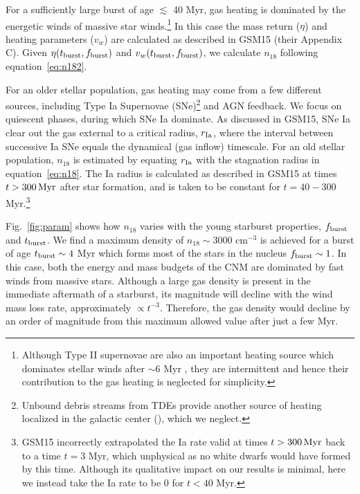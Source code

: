 \documentclass[usenatbib,fleqn]{mnras}
\newcommand{\Msun}{{\rm M_\odot}}
\begin{document}
For a sufficiently large burst of age $\lesssim$ 40 Myr, gas
heating is dominated by the energetic winds of massive star
winds.\footnote{Although Type II supernovae are also an important heating
  source which dominates stellar winds after $\sim$6 Myr
  \citep{Voss+2009}, they are intermittent and hence their
  contribution to the gas heating is neglected for simplicity.}  In
this case the mass return ($\eta$) and heating parameters ($v_w$) are
calculated as described in GSM15 (their Appendix C).  Given
$\eta(t_{\rm burst},f_{\rm burst})$ and $v_w(t_{\rm burst},f_{\rm
  burst})$, we calculate $n_{18}$ following equation~\eqref{eq:n182}.

For an older stellar population, gas heating may come from a few
different sources, including Type Ia Supernovae (SNe)\footnote{Unbound
  debris streams from TDEs provide another source of heating localized
  in the galactic center (\citealt{Guillochon+2015a}), which we
  neglect.} and AGN feedback.  We focus on
quiescent phases, during which SNe Ia dominate.  As discussed in
GSM15, SNe Ia clear out the gas external to a critical radius, $r_{\rm
  Ia}$, where the interval between successive Ia SNe equals the
dynamical (gas inflow) timescale.  For an old stellar population,
$n_{18}$ is estimated by equating $r_{\rm Ia}$ with the stagnation
radius in equation~\eqref{eq:n18}.  The Ia radius is calculated as
described in GSM15 at times $t>300 \,{\rm Myr}$ after star formation,
and is taken to be constant for $t = 40-300$ Myr.\footnote{GSM15
  incorrectly extrapolated the Ia rate valid at times $t>300 \,{\rm
    Myr}$ back to a time $t = 3$ Myr, which unphysical as no white
  dwarfs would have formed by this time.  Although its qualitative
  impact on our results is minimal, here we instead take the Ia rate
  to be 0 for $ t < 40$ Myr.}


Fig.~\ref{fig:param} shows how $n_{18}$ varies with the young
starburst properties, $f_{\rm burst}$ and $t_{\rm burst}$.  We find a
maximum density of $n_{18} \sim 3000$ cm$^{-3}$ is achieved for a
burst of age $t_{\rm burst} \sim 4$ Myr which forms most of the stars
in the nucleus $f_{\rm burst} \sim 1$.  In this case, both the energy
and mass budgets of the CNM are dominated by fast winds from massive
stars.  Although a large gas density is present in the immediate
aftermath of a starburst, its magnitude will decline with the wind
mass loss rate, approximately $\propto t^{-3}$.  Therefore, the gas
density would decline by an order of magnitude from this maximum
allowed value after just a few Myr.
\end{document}
